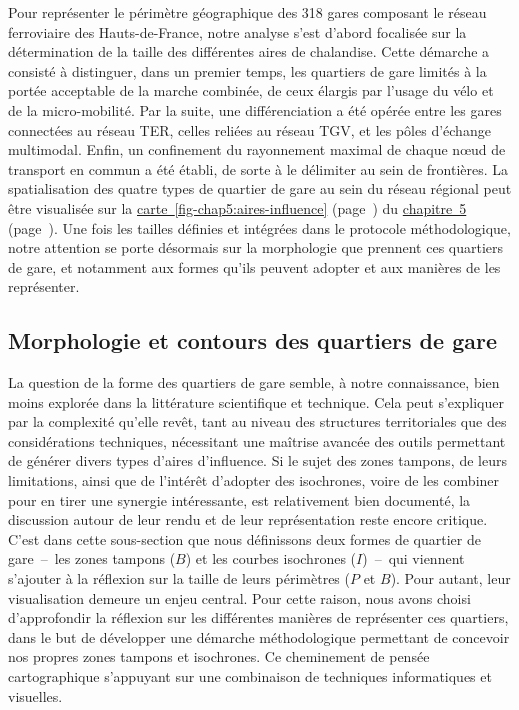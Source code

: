 \begin{refsegment}
Pour représenter le périmètre géographique des 318 gares composant le réseau ferroviaire des Hauts-de-France, notre analyse s’est d’abord focalisée sur la détermination de la taille des différentes aires de chalandise. Cette démarche a consisté à distinguer, dans un premier temps, les quartiers de gare limités à la portée acceptable de la marche combinée, de ceux élargis par l’usage du vélo et de la micro-mobilité. Par la suite, une différenciation a été opérée entre les gares connectées au réseau \acrshort{TER}, celles reliées au réseau \acrshort{TGV}, et les pôles d'échange multimodal. Enfin, un confinement du rayonnement maximal de chaque nœud de transport en commun a été établi, de sorte à le délimiter au sein de frontières. La spatialisation des quatre types de quartier de gare au sein du réseau régional peut être visualisée sur la \hyperref[fig-chap5:aires-influence]{carte~\ref{fig-chap5:aires-influence}} (page~\pageref{fig-chap5:aires-influence}) du \hyperref[chap5:titre]{chapitre~5} (page~\pageref{chap5:titre}). Une fois les tailles définies et intégrées dans le protocole méthodologique, notre attention se porte désormais sur la morphologie que prennent ces quartiers de gare, et notamment aux formes qu'ils peuvent adopter et aux manières de les représenter.%

\subsection{Morphologie et contours des quartiers de gare
    \label{chap3:quartiers-gare-formes}
    }

La question de la forme des quartiers de gare semble, à notre connaissance, bien moins explorée dans la littérature scientifique et technique. Cela peut s'expliquer par la complexité qu’elle revêt, tant au niveau des structures territoriales que des considérations techniques, nécessitant une maîtrise avancée des outils permettant de générer divers types d’aires d’influence. Si le sujet des zones tampons, de leurs limitations, ainsi que de l’intérêt d’adopter des isochrones, voire de les combiner pour en tirer une synergie intéressante, est relativement bien documenté, la discussion autour de leur rendu et de leur représentation reste encore critique. C’est dans cette sous-section que nous définissons deux formes de quartier de gare~–~les zones tampons (\(B\)) et les courbes isochrones (\(I\))~–~qui viennent s’ajouter à la réflexion sur la taille de leurs périmètres (\(P\) et \(B\)). Pour autant, leur visualisation demeure un enjeu central. Pour cette raison, nous avons choisi d’approfondir la réflexion sur les différentes manières de représenter ces quartiers, dans le but de développer une démarche méthodologique permettant de concevoir nos propres zones tampons et isochrones. Ce cheminement de pensée cartographique s’appuyant sur une combinaison de techniques informatiques et visuelles.%


\end{refsegment}
